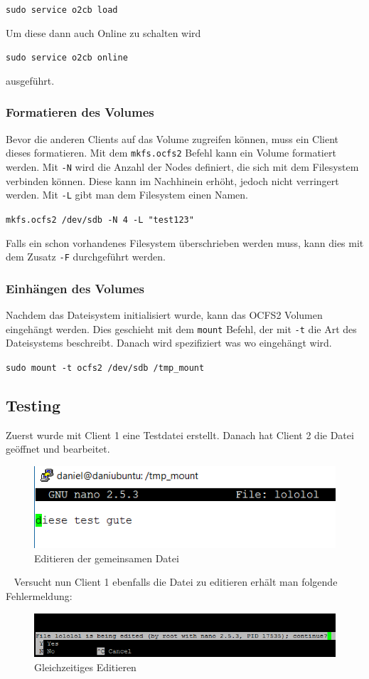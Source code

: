 \texttt{sudo service o2cb load}

Um diese dann auch Online zu schalten wird

\texttt{sudo service o2cb online}

ausgeführt. \cite{ocfs2faq}
\subsubsection{Formatieren des Volumes}
Bevor die anderen Clients auf das Volume zugreifen können, muss ein Client dieses formatieren. 
Mit dem \texttt{mkfs.ocfs2} Befehl kann ein Volume formatiert werden. Mit \texttt{-N} wird die Anzahl der Nodes definiert, die sich mit dem Filesystem verbinden können. Diese kann im Nachhinein erhöht, jedoch nicht verringert werden. Mit \texttt{-L} gibt man dem Filesystem einen Namen.

\texttt{mkfs.ocfs2 /dev/sdb -N 4 -L "test123"}

Falls ein schon vorhandenes Filesystem überschrieben werden muss, kann dies mit dem Zusatz \texttt{-F} durchgeführt werden. 

\subsubsection{Einhängen des Volumes}
Nachdem das Dateisystem initialisiert wurde, kann das OCFS2 Volumen eingehängt werden. Dies geschieht mit dem \texttt{mount} Befehl, der mit \texttt{-t} die Art des Dateisystems beschreibt. Danach wird spezifiziert was wo eingehängt wird. \cite{ocfs2faq}

\texttt{sudo mount -t ocfs2 /dev/sdb /tmp\_mount}

\subsection{Testing}
Zuerst wurde mit Client 1 eine Testdatei erstellt. Danach hat Client 2 die Datei geöffnet und bearbeitet.
\begin{figure}[!h]
	\begin{center}
		\includegraphics[width=0.5\linewidth]{images/edit.png}
		\caption{Editieren der gemeinsamen Datei}
		\label{edit}
	\end{center}
\end{figure}\
\clearpage
Versucht nun Client 1 ebenfalls die Datei zu editieren erhält man folgende Fehlermeldung:
\begin{figure}[!h]
	\begin{center}
		\includegraphics[width=0.8\linewidth]{images/error.png}
		\caption{Gleichzeitiges Editieren}
		\label{error}
	\end{center}
\end{figure}\

